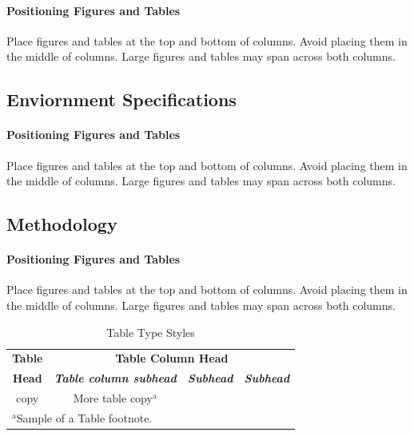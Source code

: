 \documentclass[conference]{IEEEtran}
\begin{document}
\paragraph{Positioning Figures and Tables} Place figures and tables at the top and 
bottom of columns. Avoid placing them in the middle of columns. Large 
figures and tables may span across both columns. 

\subsection{Enviornment Specifications}
\paragraph{Positioning Figures and Tables} Place figures and tables at the top and 
bottom of columns. Avoid placing them in the middle of columns. Large 
figures and tables may span across both columns. 

\subsection{Methodology}
\paragraph{Positioning Figures and Tables} Place figures and tables at the top and 
bottom of columns. Avoid placing them in the middle of columns. Large 
figures and tables may span across both columns. 

\begin{table}[htbp]
\caption{Table Type Styles}
\begin{center}
\begin{tabular}{|c|c|c|c|}
\hline
\textbf{Table}&\multicolumn{3}{|c|}{\textbf{Table Column Head}} \\
\cline{2-4} 
\textbf{Head} & \textbf{\textit{Table column subhead}}& \textbf{\textit{Subhead}}& \textbf{\textit{Subhead}} \\
\hline
copy& More table copy$^{\mathrm{a}}$& &  \\
\hline
\multicolumn{4}{l}{$^{\mathrm{a}}$Sample of a Table footnote.}
\end{tabular}
\label{tab1}
\end{center}
\end{table}
\end{document}
